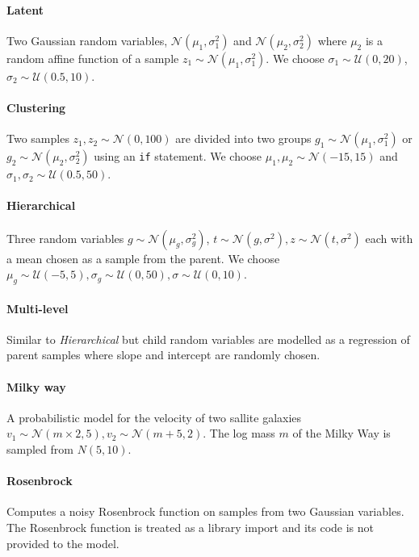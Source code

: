 \paragraph{Latent} Two Gaussian random variables, $\mathcal{N}(\mu_1, \sigma^2_1)$ and $\mathcal{N}(\mu_2, \sigma^2_2)$ where $\mu_2$ is a random affine function of a sample $z_1 \sim \mathcal{N}(\mu_1, \sigma^2_1)$. We choose $\sigma_1 \sim \mathcal{U}(0, 20)$, $\sigma_2 \sim \mathcal{U}(0.5, 10)$.

\paragraph{Clustering} Two samples $z_1,z_2 \sim \mathcal{N}(0, 100)$ are divided into two groups $g_1 \sim \mathcal{N}(\mu_1, \sigma^2_1)$ or $g_2 \sim \mathcal{N}(\mu_2, \sigma^2_2)$ using an \texttt{if} statement. We choose $\mu_1, \mu_2 \sim \mathcal{N}(-15, 15)$ and $\sigma_1, \sigma_2 \sim \mathcal{U}(0.5, 50)$.

\paragraph{Hierarchical} Three random variables $g \sim \mathcal{N}(\mu_g, \sigma^2_g)$, $t \sim \mathcal{N}(g, \sigma^2), z \sim \mathcal{N}(t, \sigma^2)$ each with a mean chosen as a sample from the parent. We choose $\mu_g \sim \mathcal{U}(-5, 5), \sigma_g \sim \mathcal{U}(0, 50), \sigma \sim \mathcal{U}(0, 10)$.

\paragraph{Multi-level} Similar to \textit{Hierarchical} but child random variables are modelled as a regression of parent samples where slope and intercept are randomly chosen.

\paragraph{Milky way} A probabilistic model for the velocity of two sallite galaxies $v_1 \sim \mathcal{N}(m \times 2, 5), v_2 \sim \mathcal{N}(m + 5, 2)$. The log mass $m$ of the Milky Way is sampled from $N(5, 10)$.

\paragraph{Rosenbrock} Computes a noisy Rosenbrock function on samples from two Gaussian variables. The Rosenbrock function is treated as a library import and its code is not provided to the model.\newline

